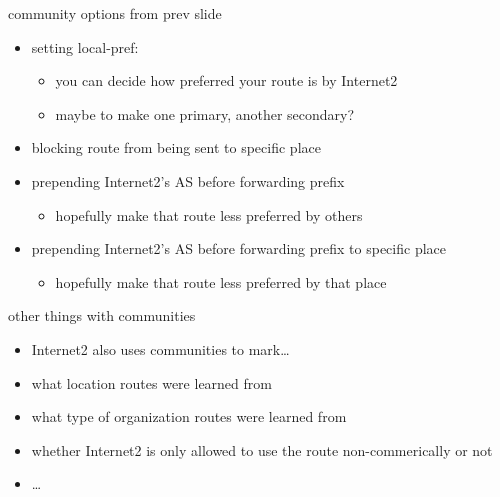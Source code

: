 \begin{frame}{community options from prev slide}
\begin{itemize}
\item setting local-pref:
    \begin{itemize}
    \item you can decide how preferred your route is by Internet2
    \item maybe to make one primary, another secondary?
    \end{itemize}
\item blocking route from being sent to specific place
\item prepending Internet2's AS before forwarding prefix
    \begin{itemize}
    \item hopefully make that route less preferred by others
    \end{itemize}
\item prepending Internet2's AS before forwarding prefix to specific place
    \begin{itemize}
    \item hopefully make that route less preferred by that place
    \end{itemize}
\end{itemize}
\end{frame}

\begin{frame}{other things with communities}
    \begin{itemize}
    \item Internet2 also uses communities to mark\ldots
    \item what location routes were learned from
    \item what type of organization routes were learned from
    \item whether Internet2 is only allowed to use the route non-commerically or not
    \item \ldots
    \end{itemize}
\end{frame}

